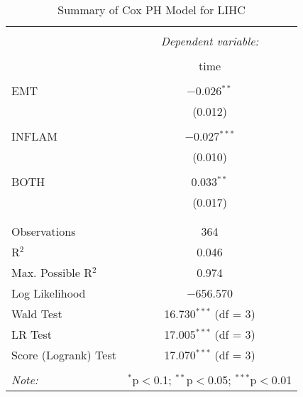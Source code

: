 
\begin{table}[!htbp] \centering 
  \caption{Summary of Cox PH Model for LIHC} 
  \label{table:LIHC_cph} 
\begin{tabular}{@{\extracolsep{5pt}}lc} 
\\[-1.8ex]\hline 
\hline \\[-1.8ex] 
 & \multicolumn{1}{c}{\textit{Dependent variable:}} \\ 
\cline{2-2} 
\\[-1.8ex] & time \\ 
\hline \\[-1.8ex] 
 EMT & $-$0.026$^{**}$ \\ 
  & (0.012) \\ 
  & \\ 
 INFLAM & $-$0.027$^{***}$ \\ 
  & (0.010) \\ 
  & \\ 
 BOTH & 0.033$^{**}$ \\ 
  & (0.017) \\ 
  & \\ 
\hline \\[-1.8ex] 
Observations & 364 \\ 
R$^{2}$ & 0.046 \\ 
Max. Possible R$^{2}$ & 0.974 \\ 
Log Likelihood & $-$656.570 \\ 
Wald Test & 16.730$^{***}$ (df = 3) \\ 
LR Test & 17.005$^{***}$ (df = 3) \\ 
Score (Logrank) Test & 17.070$^{***}$ (df = 3) \\ 
\hline 
\hline \\[-1.8ex] 
\textit{Note:}  & \multicolumn{1}{r}{$^{*}$p$<$0.1; $^{**}$p$<$0.05; $^{***}$p$<$0.01} \\ 
\end{tabular} 
\end{table} 
